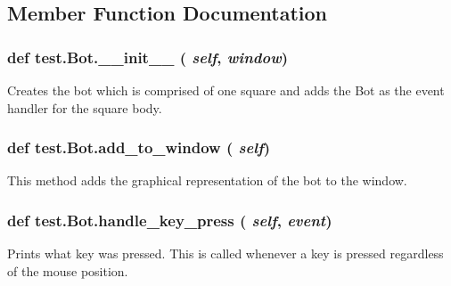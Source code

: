 \subsection{Member Function Documentation}
\hypertarget{classtest_1_1Bot_afd02701d66ad1d70592c747a8fe4b31e}{
\subsubsection[{\_\-\_\-init\_\-\_\-}]{\setlength{\rightskip}{0pt plus 5cm}def test.Bot.\_\-\_\-init\_\-\_\- ( {\em self}, \/   {\em window})}}
\label{classtest_1_1Bot_afd02701d66ad1d70592c747a8fe4b31e}
\begin{DoxyVerb}Creates the bot which is comprised of one square and adds the Bot
as the event handler for the square body. \end{DoxyVerb}
 \hypertarget{classtest_1_1Bot_a91d816dfcbfb7312349556dbae3737e6}{
\subsubsection[{add\_\-to\_\-window}]{\setlength{\rightskip}{0pt plus 5cm}def test.Bot.add\_\-to\_\-window ( {\em self})}}
\label{classtest_1_1Bot_a91d816dfcbfb7312349556dbae3737e6}
\begin{DoxyVerb}This method adds the graphical representation of the bot
to the window. \end{DoxyVerb}
 \hypertarget{classtest_1_1Bot_a23b90152ec8fa124851cd5fe6944beed}{
\subsubsection[{handle\_\-key\_\-press}]{\setlength{\rightskip}{0pt plus 5cm}def test.Bot.handle\_\-key\_\-press ( {\em self}, \/   {\em event})}}
\label{classtest_1_1Bot_a23b90152ec8fa124851cd5fe6944beed}
\begin{DoxyVerb}Prints what key was pressed. This is called whenever a key is
pressed regardless of the mouse position. \end{DoxyVerb}
 

